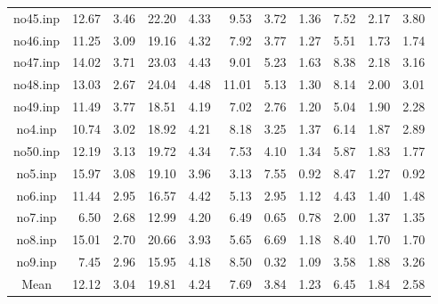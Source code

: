 {\begin{longtable}{@{}cr@{\hspace{1em}}r@{\hspace{1em}}r@{\hspace{1em}}r@{\hspace{1em}}r@{\hspace{2em}}r@{\hspace{1em}}r@{\hspace{1em}}r@{\hspace{1em}}r@{\hspace{1em}}r@{}}
no45.inp&12.67&3.46&22.20&4.33&9.53&3.72&1.36&7.52&2.17&3.80\\
no46.inp&11.25&3.09&19.16&4.32&7.92&3.77&1.27&5.51&1.73&1.74\\
no47.inp&14.02&3.71&23.03&4.43&9.01&5.23&1.63&8.38&2.18&3.16\\
no48.inp&13.03&2.67&24.04&4.48&11.01&5.13&1.30&8.14&2.00&3.01\\
no49.inp&11.49&3.77&18.51&4.19&7.02&2.76&1.20&5.04&1.90&2.28\\
no4.inp&10.74&3.02&18.92&4.21&8.18&3.25&1.37&6.14&1.87&2.89\\
no50.inp&12.19&3.13&19.72&4.34&7.53&4.10&1.34&5.87&1.83&1.77\\
no5.inp&15.97&3.08&19.10&3.96&3.13&7.55&0.92&8.47&1.27&0.92\\
no6.inp&11.44&2.95&16.57&4.42&5.13&2.95&1.12&4.43&1.40&1.48\\
no7.inp&6.50&2.68&12.99&4.20&6.49&0.65&0.78&2.00&1.37&1.35\\
no8.inp&15.01&2.70&20.66&3.93&5.65&6.69&1.18&8.40&1.70&1.70\\
no9.inp&7.45&2.96&15.95&4.18&8.50&0.32&1.09&3.58&1.88&3.26\\
\midrule
Mean&12.12&3.04&19.81&4.24&7.69&3.84&1.23&6.45&1.84&2.58\\
\bottomrule
\end{longtable}}
